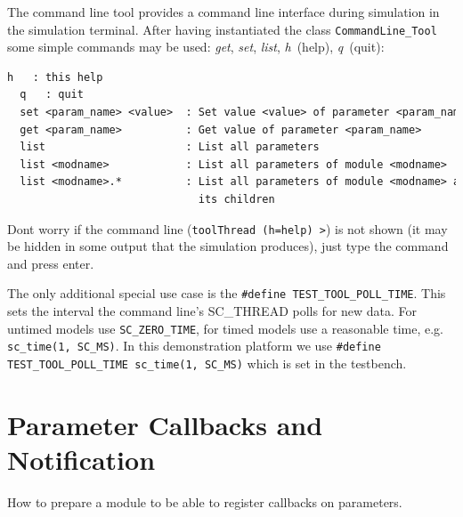 The command line tool provides a command line interface during simulation in the simulation terminal. After having instantiated the class \lstinline|CommandLine_Tool| some simple commands may be used: \emph{get}, \emph{set}, \emph{list}, \emph{h}~(help), \emph{q}~(quit):

\begin{minipage}{\textwidth}
\begin{lstlisting}[language=TeX]
  h   : this help
  q   : quit
  set <param_name> <value>  : Set value <value> of parameter <param_name> 
  get <param_name>          : Get value of parameter <param_name>
  list                      : List all parameters
  list <modname>            : List all parameters of module <modname>
  list <modname>.*          : List all parameters of module <modname> and 
                              its children
\end{lstlisting}
\end{minipage}

Dont worry if the command line (\lstinline|toolThread (h=help) >|) is
not shown (it may be hidden in some output that the simulation produces), just type the command and press enter. 

The only additional special use case is the  \lstinline|#define TEST_TOOL_POLL_TIME|. This sets the interval the command line's SC\_THREAD polls for new data. For untimed models use \lstinline|SC_ZERO_TIME|, for timed models use a reasonable time, e.g. \lstinline|sc_time(1, SC_MS)|. In this demonstration platform we use \lstinline[language=TeX]|#define TEST_TOOL_POLL_TIME sc_time(1, SC_MS)| which is set in the testbench.



\newpage
\section{Parameter Callbacks and Notification}
\label{ParameterCallbacks}



How to prepare a module to be able to register callbacks on parameters.

